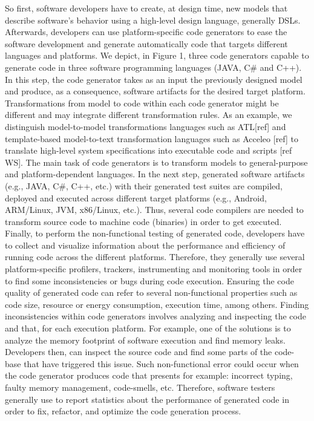 So first, software developers have to create, at design time, new models that describe software's behavior using a high-level design language, generally DSLs. Afterwards, developers can use platform-specific code generators to ease the software development and generate automatically code that targets different languages and platforms. We depict, in Figure 1, three code generators capable to generate code in three software programming languages (JAVA, C\# and C++). In this step, the code generator takes as an input the previously designed model and produce, as a consequence, software artifacts for the desired target platform. Transformations from model to code within each code generator might be different and may integrate different transformation rules. As an example, we distinguish model-to-model transformations languages such as ATL[ref] and template-based model-to-text transformation languages such as Acceleo [ref] to translate high-level system specifications into executable code and scripts [ref WS]. The main task of code generators is to transform models to general-purpose and platform-dependent languages. In the next step, generated software artifacts (e.g., JAVA, C\#, C++, etc.) with their generated test suites are compiled, deployed and executed across different target platforms (e.g., Android, ARM/Linux, JVM, x86/Linux, etc.). Thus, several code compilers are needed to transform source code to machine code (binaries) in order to get executed. 
Finally, to perform the non-functional testing of generated code, developers have to collect and visualize information about the performance and efficiency of running code across the different platforms. 
Therefore, they generally use several platform-specific profilers, trackers, instrumenting and monitoring tools in order to find some inconsistencies or bugs during code execution. Ensuring the code quality of generated code can refer to several non-functional properties such as code size, resource or energy consumption, execution time, among others. Finding inconsistencies within code generators involves analyzing and inspecting the code and that, for each execution platform. For example, one of the solutions is to analyze the memory footprint of software execution and find memory leaks. Developers then, can inspect the source code and find some parts of the code-base that have triggered this issue. Such non-functional error could occur when the code generator produces code that presents for example: incorrect typing, faulty memory management, code-smells, etc. Therefore, software testers generally use to report statistics about the performance of generated code in order to fix, refactor, and optimize the code generation process.

